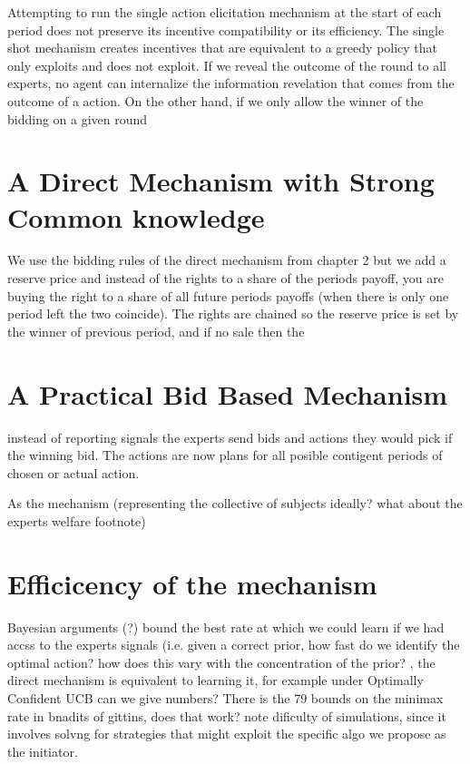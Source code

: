 Attempting to run the single action elicitation mechanism at the start of each period does not preserve its incentive compatibility or its efficiency.
The single shot mechanism creates incentives that are equivalent to a greedy policy that only exploits and does not exploit. If we reveal the outcome of the round to all experts,  no agent can internalize the information revelation that comes from the outcome of a action. On the other hand, if we only allow the winner of the bidding on a given round 

\section{A Direct Mechanism with Strong Common knowledge}

We use the bidding rules of the direct mechanism from chapter 2 but we add a reserve price and instead of the rights to a share of the periods payoff, you are buying the right to a share of all future periods payoffs (when there is only one period left the two coincide). The rights are chained so the reserve price is set by the winner of previous period, and if no sale then the 

\section{A Practical Bid Based Mechanism}

instead of reporting signals the experts send bids and actions they would pick if the winning bid. The actions are now plans for all posible contigent periods of chosen or actual action. 

As the mechanism (representing the collective of subjects ideally?  what about the experts welfare footnote) 




\section{Efficicency of the mechanism}



Bayesian arguments  (?)  bound the best rate at which we could learn if we had accss to the experts signals (i.e. given a correct prior, how fast do we identify the optimal action? how does this vary with the concentration of the prior? , the direct mechanism is equivalent to learning it, for example under Optimally Confident UCB can we give numbers? There is the 79 bounds on the minimax rate in bnadits of gittins, does that work? note dificulty of simulations, since it involves solvng for strategies that might exploit the specific algo we propose as the initiator.

